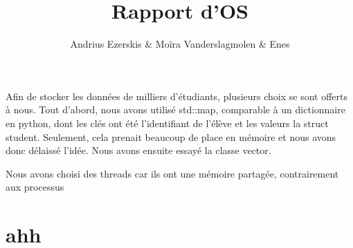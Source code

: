 \documentclass{article}
\title{Rapport d'OS}
\author{Andrius Ezerskis \& Moïra Vanderslagmolen \& Enes}
\begin{document}


Afin de stocker les données de milliers d'étudiants, plusieurs choix se sont offerts à nous. 
Tout d'abord, nous avons utilisé std::map, comparable à un dictionnaire en python, dont les
clés ont été l'identifiant de l'élève et les valeurs la struct student. Seulement, cela
prenait beaucoup de place en mémoire et nous avons donc délaissé l'idée. Nous avons ensuite essayé
la classe vector.

Nous avons choisi des threads car ils ont une mémoire partagée, contrairement aux processus
\section{ahh}
\end{document}
